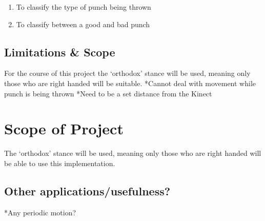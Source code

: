 \begin{enumerate}
  \item To classify the type of punch being thrown
  \item To classify between a good and bad punch
\end{enumerate}

\subsection{Limitations \& Scope}
\label{subsec:subsec01}
For the course of this project the `orthodox' stance will be used, meaning only those who are right handed will be suitable.
*Cannot deal with movement while punch is being thrown
*Need to be a set distance from the Kinect

\section{Scope of Project}
\label{sec:sec01}
The `orthodox' stance will be used, meaning only those who are right handed will be able to use this implementation.


\subsection{Other applications/usefulness?}
\label{subsec:subsec01}
*Any periodic motion?
